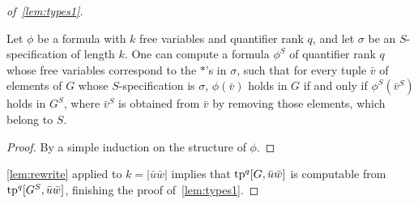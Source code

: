 \begin{proof}[of~\cref{lem:types1}]
\begin{lemma}\label{lem:rewrite}
  Let $\phi$ be a formula
  with $k$ free variables and quantifier rank $q$, 
  and let $\sigma$ be an $S$-specification of length $k$.
  One can compute a formula $\phi^S$ of quantifier rank $q$
  whose free variables correspond to the $\ast$'s in $\sigma$,
  such that for every tuple $\bar v$ of elements of $G$
  whose $S$-specification is $\sigma$,
   $\phi(\bar v)$ holds in $G$
  if and only if $\phi^S(\bar v^S)$ holds in $G^S$, where $\bar v^S$ is obtained from $\bar v$ by removing 
  those elements, which belong to $S$.
\end{lemma}
\begin{proof}\label{pf:}
By a simple induction on the structure of $\phi$.
\end{proof}
%
%

\cref{lem:rewrite} applied to $k=|\bar u\bar w|$ implies that 
$\mathrm{tp}^q[G, \bar u\bar w]$ is computable from
	$\mathrm{tp}^q[G^S, \bar u\bar w]$, finishing the proof of~\cref{lem:types1}.	
\end{proof}


